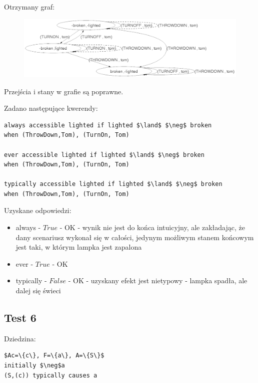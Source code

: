 \documentclass{article}
\begin{document}
Otrzymany graf:
\begin{figure}[H]
	\centering
	\includegraphics[scale=0.42]{test5_graf}
\end{figure}

Przejścia i stany w grafie są poprawne.

Zadano następujące kwerendy:
\begin{lstlisting}[mathescape=true]
always accessible lighted if lighted $\land$ $\neg$ broken 
when (ThrowDown,Tom), (TurnOn, Tom)

ever accessible lighted if lighted $\land$ $\neg$ broken 
when (ThrowDown,Tom), (TurnOn, Tom)

typically accessible lighted if lighted $\land$ $\neg$ broken 
when (ThrowDown,Tom), (TurnOn, Tom)
\end{lstlisting}
Uzyskane odpowiedzi:
\begin{itemize}
\item always - $True$ - OK - wynik nie jest do końca intuicyjny, ale zakładając, że dany scenariusz wykonał się w całości, jedynym możliwym stanem końcowym jest taki, w którym lampka jest zapalona

\item ever - $True$ - OK

\item typically - $False$ - OK - uzyskany efekt jest nietypowy - lampka spadła, ale dalej się świeci
\end{itemize}



\newpage
\subsection{Test 6}
Dziedzina:
\bigskip
{}
\begin{lstlisting}[mathescape=true]
$Ac=\{c\}, F=\{a\}, A=\{S\}$
initially $\neg$a
(S,(c)) typically causes a
\end{lstlisting}
\vspace{1cm}
\end{document}
